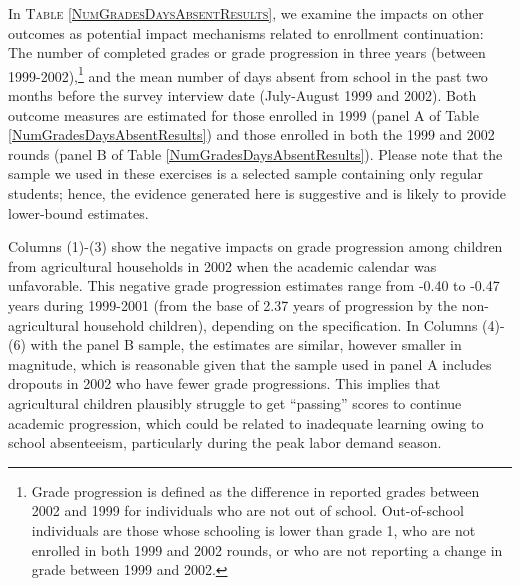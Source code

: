 \documentclass[12pt,letterpaper]{article}
\newcommand{\SAdded}[1]{\textcolor{red}{#1}}
\newcommand{\0}{\ensuremath{\mbox{\boldmath $0$}}}
\begin{document}
In \textsc{\small Table \ref{NumGradesDaysAbsentResults}}, we examine the impacts on other outcomes as potential impact mechanisms related to enrollment continuation: The number of completed grades or grade progression in three years (between 1999-2002),\footnote{Grade progression is defined as the difference in reported grades between 2002 and 1999 for individuals who are not out of school. Out-of-school individuals are those whose schooling is lower than grade 1, who are not enrolled in both 1999 and 2002 rounds, or who are not reporting a change in grade between 1999 and 2002.} and the mean number of days absent from school in the past two months before the survey interview date (July-August 1999 and 2002). Both outcome measures are estimated for those enrolled in 1999 (panel A of Table \ref{NumGradesDaysAbsentResults}) and those enrolled in both the 1999 and 2002 rounds (panel B of Table \ref{NumGradesDaysAbsentResults}). Please note that the sample we used in these exercises is a selected sample containing only regular students; hence, the evidence generated here is suggestive and is likely to provide lower-bound estimates.  

Columns (1)-(3) show the negative impacts on grade progression among children from agricultural households in 2002 when the academic calendar was unfavorable. This negative grade progression estimates range from -0.40 to -0.47 years during 1999-2001 (from the base of 2.37 years of progression by the non-agricultural household children), depending on the specification. In Columns (4)-(6) with the panel B sample, the estimates are similar, however smaller in magnitude, which is reasonable given that the sample used in panel A includes dropouts in 2002 who have fewer grade progressions. This implies that agricultural children plausibly struggle to get ``passing'' scores to continue academic progression, which could be related to inadequate learning owing to school absenteeism, particularly during the peak labor demand season. 



 


\end{document}
